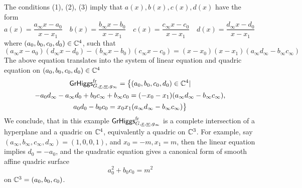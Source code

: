 \documentclass[12pt,psamsfonts,reqno]{amsart}
\begin{document}
\begin{proposition}
   The conditions (1), (2), (3) imply that $a(x), b(x), c(x), d(x)$ have the form
   \begin{equation}
     a(x) =  \frac{a_\infty x  - a_0}{x - x_1}\quad
     b(x) = \frac{ b_\infty x  - b_0}{x - x_1}\quad
     c(x) = \frac{ c_\infty  x  - c_0}{x - x_1}\quad
     d(x) = \frac{d_\infty  x  - d_0}{x - x_1}\quad
   \end{equation}
where $ (a_0, b_0, c_0, d_0) \in \mathbb C^4$, 
   such that
   \begin{equation}
 (     a_\infty x - a_0)( d_\infty x - d_0) -   (b_\infty x - b_0)(c_\infty x -c_0) =
     (x - x_0)(x- x_1) (a_\infty d_\infty - b_\infty c_\infty)
   \end{equation}
   The above equation translates into the system of linear
   equation and quadric equation on  $(a_0, b_0, c_0, d_0) \in \mathbb C^4$ 
   \begin{multline}
     \mathsf{GrHiggs}^{\mathrm{fr}}_{G,\underline{x}, \underline{w}, g_\infty} =
\big \{  (a_0, b_0, c_0, d_0) \in \mathbb C^4 | \\
       -a_0 d_\infty - a_\infty d_0 + b_0 c_\infty + b_\infty c_0 
       = ( - x_0 - x_1) (a_\infty d_\infty - b_\infty c_\infty), \\
      a_0 d_0 - b_0 c_0 = 
       x_0 x_1 (a_\infty d_\infty - b_\infty c_\infty) \big \}
     \end{multline}
     We conclude, that in this example $     \mathsf{GrHiggs}^{\mathrm{fr}}_{G,\underline{x}, \underline{w}, g_\infty}$ is a complete intersection of a hyperplane and a  quadric on $\mathbb C^4$, equivalently a quadric on $\mathbb C^3$. For example,
     say $(a_\infty, b_\infty, c_\infty, d_\infty) = (1,0,0,1)$,
     and $x_0 = -m, x_1 = m$, then the linear equation implies $d_0 = -a_0$,
     and the quadratic equation gives a canonical form of smooth affine quadric
     surface 
     \begin{equation}
         a_0^2 + b_0 c_0  = m^2 
     \end{equation}
on  $\mathbb C^3 = (a_0, b_0, c_0)$.
\end{proposition}
\end{document}

